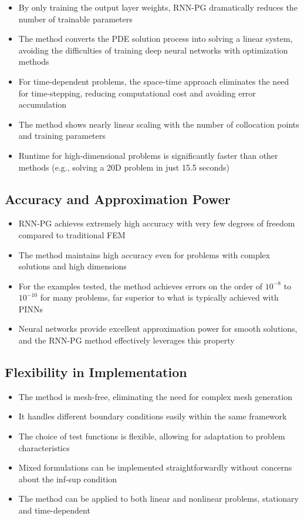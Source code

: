\documentclass[11pt,a4paper]{article}
\begin{document}
\begin{itemize}
    \item By only training the output layer weights, RNN-PG dramatically reduces the number of trainable parameters
    \item The method converts the PDE solution process into solving a linear system, avoiding the difficulties of training deep neural networks with optimization methods
    \item For time-dependent problems, the space-time approach eliminates the need for time-stepping, reducing computational cost and avoiding error accumulation
    \item The method shows nearly linear scaling with the number of collocation points and training parameters
    \item Runtime for high-dimensional problems is significantly faster than other methods (e.g., solving a 20D problem in just 15.5 seconds)
\end{itemize}

\subsection{Accuracy and Approximation Power}

\begin{itemize}
    \item RNN-PG achieves extremely high accuracy with very few degrees of freedom compared to traditional FEM
    \item The method maintains high accuracy even for problems with complex solutions and high dimensions
    \item For the examples tested, the method achieves errors on the order of $10^{-8}$ to $10^{-10}$ for many problems, far superior to what is typically achieved with PINNs
    \item Neural networks provide excellent approximation power for smooth solutions, and the RNN-PG method effectively leverages this property
\end{itemize}

\subsection{Flexibility in Implementation}

\begin{itemize}
    \item The method is mesh-free, eliminating the need for complex mesh generation
    \item It handles different boundary conditions easily within the same framework
    \item The choice of test functions is flexible, allowing for adaptation to problem characteristics
    \item Mixed formulations can be implemented straightforwardly without concerns about the inf-sup condition
    \item The method can be applied to both linear and nonlinear problems, stationary and time-dependent
\end{itemize}
\end{document}
